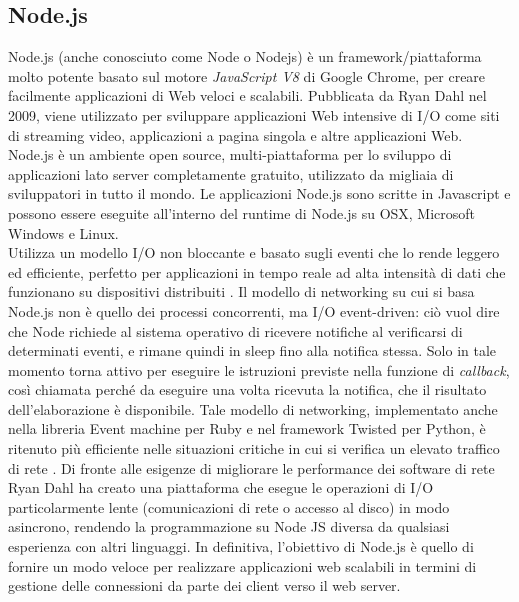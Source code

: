 \subsection{Node.js}
\label{sec:nodejs}
Node.js (anche conosciuto come Node o Nodejs) è un framework/piattaforma molto potente basato sul motore \textit{JavaScript V8} di Google Chrome, per creare facilmente applicazioni di Web veloci e scalabili. Pubblicata da Ryan Dahl nel 2009, viene utilizzato per sviluppare applicazioni Web intensive di I/O come siti di streaming video, applicazioni a pagina singola e altre applicazioni Web. Node.js è un ambiente open source, multi-piattaforma per lo sviluppo di applicazioni lato server completamente gratuito, utilizzato da migliaia di sviluppatori in tutto il mondo. Le applicazioni Node.js sono scritte in Javascript e possono essere eseguite all'interno del runtime di Node.js su OSX, Microsoft Windows e Linux. 
\\Utilizza un modello I/O non bloccante e basato sugli eventi che lo rende leggero ed efficiente, perfetto per applicazioni in tempo reale ad alta intensità di dati che funzionano su dispositivi distribuiti \cite{node:home}. Il modello di networking su cui si basa Node.js non è quello dei processi concorrenti, ma I/O event-driven: ciò vuol dire che Node richiede al sistema operativo di ricevere notifiche al verificarsi di determinati eventi, e rimane quindi in sleep fino alla notifica stessa. Solo in tale momento torna attivo per eseguire le istruzioni previste nella funzione di \textit{callback}, così chiamata perché da eseguire una volta ricevuta la notifica, che il risultato dell'elaborazione è disponibile. Tale modello di networking, implementato anche nella libreria Event machine per Ruby e nel framework Twisted per Python, è ritenuto più efficiente nelle situazioni critiche in cui si verifica un elevato traffico di rete \cite{node:wiki}. Di fronte alle esigenze di migliorare le performance dei software di rete Ryan Dahl ha creato una piattaforma che esegue le operazioni di I/O particolarmente lente (comunicazioni di rete o accesso al disco) in modo asincrono, rendendo la programmazione su Node JS diversa da qualsiasi esperienza con altri linguaggi. In definitiva, l'obiettivo di Node.js è quello di fornire un modo veloce per realizzare applicazioni web scalabili in termini di gestione delle connessioni da parte dei client verso il web server.
